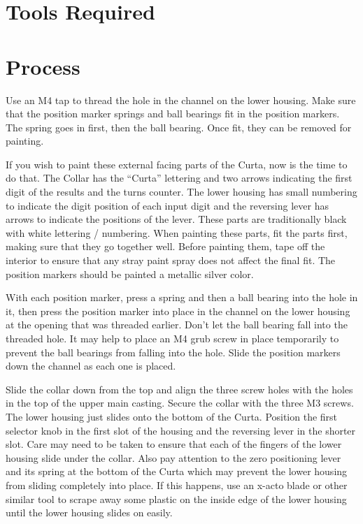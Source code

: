 \documentclass[openany]{book}
\begin{document}
\section{Tools Required}

\section{Process}
Use an M4 tap to thread the hole in the channel on the lower housing. Make sure that the position marker springs and ball bearings fit in the position markers. The spring goes in first, then the ball bearing. Once fit, they can be removed for painting.

If you wish to paint these external facing parts of the Curta, now is the time to do that. The Collar has the “Curta” lettering and two arrows indicating the first digit of the results and the turns counter. The lower housing has small numbering to indicate the digit position of each input digit and the reversing lever has arrows to indicate the positions of the lever. These parts are traditionally black with white lettering / numbering. When painting these parts, fit the parts first, making sure that they go together well. Before painting them, tape off the interior to ensure that any stray paint spray does not affect the final fit. The position markers should be painted a metallic silver color.

With each position marker, press a spring and then a ball bearing into the hole in it, then press the position marker into place in the channel on the lower housing at the opening that was threaded earlier. Don't let the ball bearing fall into the threaded hole. It may help to place an M4 grub screw in place temporarily to prevent the ball bearings from falling into the hole. Slide the position markers down the channel as each one is placed.

Slide the collar down from the top and align the three screw holes with the holes in the top of the upper main casting. Secure the collar with the three M3 screws. The lower housing just slides onto the bottom of the Curta. Position the first selector knob in the first slot of the housing and the reversing lever in the shorter slot. Care may need to be taken to ensure that each of the fingers of the lower housing slide under the collar. Also pay attention to the zero positioning lever and its spring at the bottom of the Curta which may prevent the lower housing from sliding completely into place. If this happens, use an x-acto blade or other similar tool to scrape away some plastic on the inside edge of the lower housing until the lower housing slides on easily.
\end{document}
